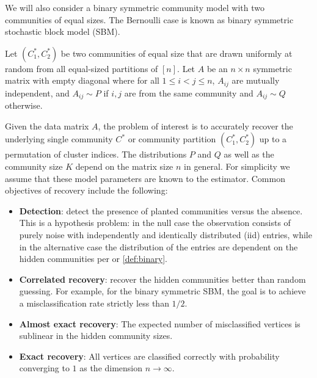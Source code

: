 We will also consider a binary symmetric community model with two communities of equal sizes. 
The Bernoulli case is known as binary symmetric stochastic block model (SBM).

 \begin{definition}
\label{def:binary}
 Let $(C_1^*,C_2^*)$ be two communities of equal size that are drawn uniformly at random from all equal-sized partitions of $[n]$.
 Let $A$ be an $n \times n$ symmetric matrix with empty diagonal
 where for all $1 \le i<j \le n$, $A_{ij}$ are mutually independent, and $A_{ij} \sim P$ if $i,j$ are from the same
 community and $A_{ij} \sim Q$ otherwise.
 \end{definition}

Given the data matrix $A$, the problem of interest is to accurately recover the underlying single community $C^*$ or community
partition $(C_1^*,C_2^*)$ up to a permutation of cluster indices. The distributions $P$ and $Q$ as well as the community size $K$
depend on the matrix size $n$ in general. For simplicity
we assume that these model parameters are known to
the estimator. Common objectives of recovery include the following:
\begin{itemize}
\item \textbf{Detection}: detect the presence of planted communities versus the absence. This is a hypothesis problem: in the null case the observation consists of purely noise with independently and identically distributed (iid) entries, 
while in the alternative case the distribution of the entries are dependent on the hidden communities per  or \ref{def:binary}.
	\item \textbf{Correlated recovery}: recover the hidden communities better than random guessing. 
	For example, for the binary symmetric SBM, the goal is to achieve a misclassification rate strictly less than $1/2$.
	\item \textbf{Almost exact recovery}: The expected number of misclassified vertices is sublinear in the hidden community sizes. 
	\item \textbf{Exact recovery}: All vertices are classified correctly with probability converging to $1$ as the dimension $n \to \infty.$ 
\end{itemize}

